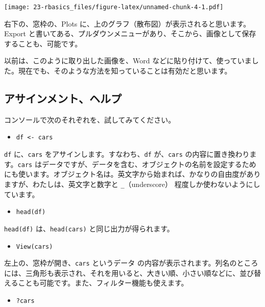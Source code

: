 \documentclass[
  xelatex, ja=standard]{bxjsbook}
\providecommand{\tightlist}{%
  \setlength{\itemsep}{0pt}\setlength{\parskip}{0pt}}
\theoremstyle{definition}
\theoremstyle{definition}
\theoremstyle{definition}
\theoremstyle{definition}
\theoremstyle{remark}
\begin{document}
\texttt{[image: 23-rbasics\_files/figure-latex/unnamed-chunk-4-1.pdf]}

右下の、窓枠の、Plots に、上のグラフ（散布図）が表示されると思います。Export と書いてある、プルダウンメニューがあり、そこから、画像として保存することも、可能です。

以前は、このように取り出した画像を、Word などに貼り付けて、使っていました。現在でも、そのような方法を知っていることは有効だと思います。

\hypertarget{ux30a2ux30b5ux30a4ux30f3ux30e1ux30f3ux30c8ux30d8ux30ebux30d7}{%
\subsection{アサインメント、ヘルプ}\label{ux30a2ux30b5ux30a4ux30f3ux30e1ux30f3ux30c8ux30d8ux30ebux30d7}}

コンソールで次のそれぞれを、試してみてください。

\begin{itemize}
\tightlist
\item
  \texttt{df\ \textless{}-\ cars}
\end{itemize}

\texttt{df} に、\texttt{cars} をアサインします。すなわち、\texttt{df} が、\texttt{cars} の内容に置き換わります。\texttt{cars} はデータですが、データを含む、オブジェクトの名前を設定するためにも使います。オブジェクト名は。英文字から始まれば、かなりの自由度がありますが、わたしは、英文字と数字と \texttt{\_}（underscore） 程度しか使わないようにしています。

\begin{itemize}
\tightlist
\item
  \texttt{head(df)}
\end{itemize}

\texttt{head(df)} は、\texttt{head(cars)} と同じ出力が得られます。

\begin{itemize}
\tightlist
\item
  \texttt{View(cars)}
\end{itemize}

左上の、窓枠が開き、\texttt{cars} というデータ の内容が表示されます。列名のところには、三角形も表示され、それを用いると、大きい順、小さい順などに、並び替えることも可能です。また、フィルター機能も使えます。

\begin{itemize}
\tightlist
\item
  \texttt{?cars}
\end{itemize}
\end{document}
